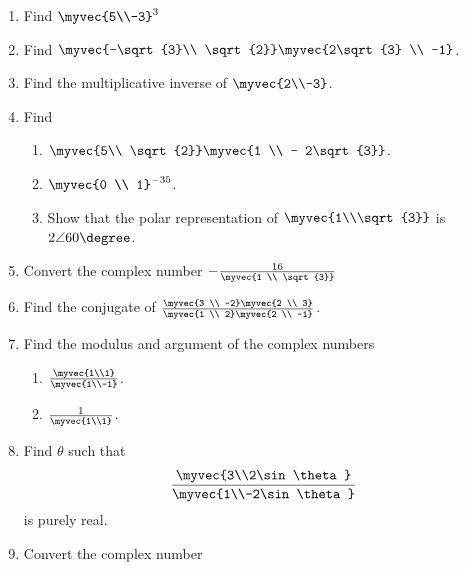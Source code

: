 \renewcommand{\theequation}{\theenumi}
\begin{enumerate}[label=\arabic*.,ref=\thesubsection.\theenumi]
\item Find $\myvec{5\\-3}^3$
\item Find $\myvec{-\sqrt{3}\\ \sqrt{2}} \myvec{2\sqrt{3} \\ -1}$.
\item Find the multiplicative inverse of $\myvec{2\\-3}$.
\item Find 
\begin{enumerate}
\item $\myvec{5\\ \sqrt{2}} \myvec{1 \\ - 2\sqrt{3}}$.
\item $\myvec{0 \\ 1}^{-35}$.
\item Show that the polar representation of $\myvec{1\\\sqrt{3}}$ is $2\angle 60\degree$.
\end{enumerate}
\item Convert the complex number $-\frac{16}{\myvec{1 \\ \sqrt{3}}}$
\item Find the conjugate of $\frac{\myvec{3 \\ -2}\myvec{2 \\ 3}}{\myvec{1 \\ 2}\myvec{2 \\ -1}}$.
\item Find the modulus and argument of the complex numbers
\begin{enumerate}
\item $\frac{\myvec{1\\1}}{\myvec{1\\-1}}$.
\item $\frac{1}{\myvec{1\\1}}$.
\end{enumerate}
\item Find $\theta$ such that 
\begin{align}
\frac{\myvec{3\\2\sin\theta}}{\myvec{1\\-2\sin\theta}}
\end{align}
%
is purely real.
\item Convert the complex number 
\begin{align}

\end{align}
\end{enumerate}
